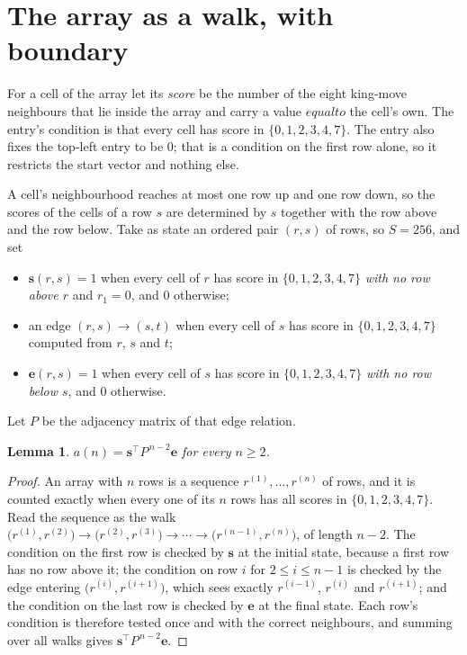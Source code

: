 \documentclass[11pt,a4paper]{article}
\theoremstyle{plain}
\newtheorem{lemma}[theorem]{Lemma}
\theoremstyle{definition}
\begin{document}
\section{The array as a walk, with boundary}

For a cell of the array let its \emph{score} be the number of the eight king-move neighbours that lie inside
the array and carry a value $equal to$ the cell's own. The entry's condition is that every cell
has score in $\{0,1,2,3,4,7\}$. The entry also fixes the top-left entry to be $0$; that is a condition on the first row alone, so it restricts the start vector and nothing else.

A cell's neighbourhood reaches at most one row up and one row down, so the scores of the
cells of a row $s$ are determined by $s$ together with the row above and the row below.
Take as state an ordered pair $(r,s)$ of rows, so $S=256$, and set
\begin{itemize}
\item $\mathbf{s}(r,s)=1$ when every cell of $r$ has score in $\{0,1,2,3,4,7\}$ \emph{with no row
above $r$} and $r_1=0$, and $0$ otherwise;
\item an edge $(r,s)\to(s,t)$ when every cell of $s$ has score in $\{0,1,2,3,4,7\}$ computed from
$r$, $s$ and $t$;
\item $\mathbf{e}(r,s)=1$ when every cell of $s$ has score in $\{0,1,2,3,4,7\}$ \emph{with no row
below $s$}, and $0$ otherwise.
\end{itemize}
Let $P$ be the adjacency matrix of that edge relation.

\begin{lemma}\label{lem:walk}
$a(n)=\mathbf{s}^{\!\top}P^{\,n-2}\mathbf{e}$ for every $n\ge2$.
\end{lemma}

\begin{proof}
An array with $n$ rows is a sequence $r^{(1)},\dots,r^{(n)}$ of rows, and it is counted
exactly when every one of its $n$ rows has all scores in $\{0,1,2,3,4,7\}$. Read the sequence as the
walk $\bigl(r^{(1)},r^{(2)}\bigr)\to\bigl(r^{(2)},r^{(3)}\bigr)\to\cdots\to
\bigl(r^{(n-1)},r^{(n)}\bigr)$, of length $n-2$. The condition on the first row is
checked by $\mathbf{s}$ at the initial state, because a first row has no row above it; the
condition on row $i$ for $2\le i\le n-1$ is checked by the edge entering
$\bigl(r^{(i)},r^{(i+1)}\bigr)$, which sees exactly $r^{(i-1)}$, $r^{(i)}$ and
$r^{(i+1)}$; and the condition on the last row is checked by $\mathbf{e}$ at the final
state. Each row's condition is therefore tested once and with the correct neighbours, and
summing over all walks gives $\mathbf{s}^{\!\top}P^{\,n-2}\mathbf{e}$.
\end{proof}
\end{document}
